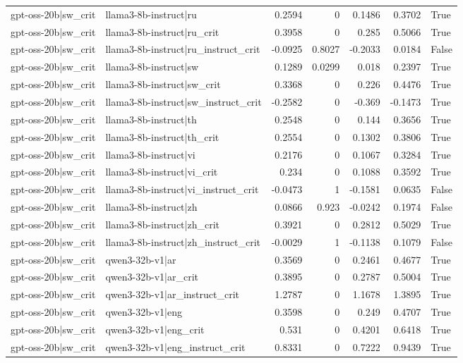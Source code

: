 \begin{table}
\begin{tabular}{l l r r r r l}
gpt-oss-20b|sw_crit & llama3-8b-instruct|ru & 0.2594 & 0 & 0.1486 & 0.3702 & True \\
gpt-oss-20b|sw_crit & llama3-8b-instruct|ru_crit & 0.3958 & 0 & 0.285 & 0.5066 & True \\
gpt-oss-20b|sw_crit & llama3-8b-instruct|ru_instruct_crit & -0.0925 & 0.8027 & -0.2033 & 0.0184 & False \\
gpt-oss-20b|sw_crit & llama3-8b-instruct|sw & 0.1289 & 0.0299 & 0.018 & 0.2397 & True \\
gpt-oss-20b|sw_crit & llama3-8b-instruct|sw_crit & 0.3368 & 0 & 0.226 & 0.4476 & True \\
gpt-oss-20b|sw_crit & llama3-8b-instruct|sw_instruct_crit & -0.2582 & 0 & -0.369 & -0.1473 & True \\
gpt-oss-20b|sw_crit & llama3-8b-instruct|th & 0.2548 & 0 & 0.144 & 0.3656 & True \\
gpt-oss-20b|sw_crit & llama3-8b-instruct|th_crit & 0.2554 & 0 & 0.1302 & 0.3806 & True \\
gpt-oss-20b|sw_crit & llama3-8b-instruct|vi & 0.2176 & 0 & 0.1067 & 0.3284 & True \\
gpt-oss-20b|sw_crit & llama3-8b-instruct|vi_crit & 0.234 & 0 & 0.1088 & 0.3592 & True \\
gpt-oss-20b|sw_crit & llama3-8b-instruct|vi_instruct_crit & -0.0473 & 1 & -0.1581 & 0.0635 & False \\
gpt-oss-20b|sw_crit & llama3-8b-instruct|zh & 0.0866 & 0.923 & -0.0242 & 0.1974 & False \\
gpt-oss-20b|sw_crit & llama3-8b-instruct|zh_crit & 0.3921 & 0 & 0.2812 & 0.5029 & True \\
gpt-oss-20b|sw_crit & llama3-8b-instruct|zh_instruct_crit & -0.0029 & 1 & -0.1138 & 0.1079 & False \\
gpt-oss-20b|sw_crit & qwen3-32b-v1|ar & 0.3569 & 0 & 0.2461 & 0.4677 & True \\
gpt-oss-20b|sw_crit & qwen3-32b-v1|ar_crit & 0.3895 & 0 & 0.2787 & 0.5004 & True \\
gpt-oss-20b|sw_crit & qwen3-32b-v1|ar_instruct_crit & 1.2787 & 0 & 1.1678 & 1.3895 & True \\
gpt-oss-20b|sw_crit & qwen3-32b-v1|eng & 0.3598 & 0 & 0.249 & 0.4707 & True \\
gpt-oss-20b|sw_crit & qwen3-32b-v1|eng_crit & 0.531 & 0 & 0.4201 & 0.6418 & True \\
gpt-oss-20b|sw_crit & qwen3-32b-v1|eng_instruct_crit & 0.8331 & 0 & 0.7222 & 0.9439 & True \\

\end{tabular}
\end{table}
